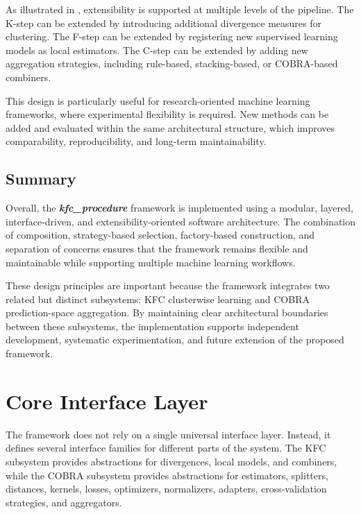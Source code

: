 As illustrated in , extensibility is supported at multiple levels of the pipeline. The K-step can be extended by introducing additional divergence measures for clustering. The F-step can be extended by registering new supervised learning models as local estimators. The C-step can be extended by adding new aggregation strategies, including rule-based, stacking-based, or COBRA-based combiners.

This design is particularly useful for research-oriented machine learning frameworks, where experimental flexibility is required. New methods can be added and evaluated within the same architectural structure, which improves comparability, reproducibility, and long-term maintainability.


\subsection{Summary}

\hs Overall, the \textbf{\textit{kfc\_procedure}} framework is implemented using a modular, layered, interface-driven, and extensibility-oriented software architecture. The combination of composition, strategy-based selection, factory-based construction, and separation of concerns ensures that the framework remains flexible and maintainable while supporting multiple machine learning workflows.

These design principles are important because the framework integrates two related but distinct subsystems: KFC clusterwise learning and COBRA prediction-space aggregation. By maintaining clear architectural boundaries between these subsystems, the implementation supports independent development, systematic experimentation, and future extension of the proposed framework.


\section{Core Interface Layer}
\label{sec:core_interface_layer}

\hs The framework does not rely on a single universal interface layer. Instead, it defines several interface families for different parts of the system. The KFC subsystem provides abstractions for divergences, local models, and combiners, while the COBRA subsystem provides abstractions for estimators, splitters, distances, kernels, losses, optimizers, normalizers, adapters, cross-validation strategies, and aggregators.

